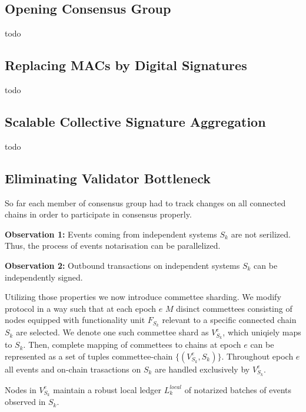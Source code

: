 \subsection{Opening Consensus Group}\label{subsec:opening-consensus-group}

todo

\subsection{Replacing MACs by Digital Signatures}\label{subsec:replacing-macs-by-digital-signatures}

todo

\subsection{Scalable Collective Signature Aggregation}\label{subsec:scalable-collective-signature-aggregation}

todo

\subsection{Eliminating Validator Bottleneck}\label{subsec:eliminating-validator-bottleneck}

So far each member of consensus group had to track changes on all connected chains in order to participate in consensus properly.

\textbf{Observation 1:} Events coming from independent systems $S_k$ are not serilized.
Thus, the process of events notarisation can be parallelized.

\textbf{Observation 2:} Outbound transactions on independent systems $S_k$ can be independently signed.

Utilizing those properties we now introduce commettee sharding.
We modify protocol in a way such that at each epoch $e$ $M$ disinct commettees consisting of nodes equipped with functionality unit $F_{S_k}$ relevant to a specific connected chain $S_k$ are selected.
We denote one such commettee shard as $V^{e}_{S_k}$, which uniqiely maps to $S_k$.
Then, complete mapping of commettees to chains at epoch $e$ can be represented as a set of tuples commettee-chain $\{(V^{e}_{S_k}, S_k)\}$.
Throughout epoch $e$ all events and on-chain trasactions on $S_k$ are handled exclusively by $V^{e}_{S_k}$.

Nodes in $V^{e}_{S_k}$ maintain a robust local ledger $L^{local}_k$ of notarized batches of events observed in $S_k$.

